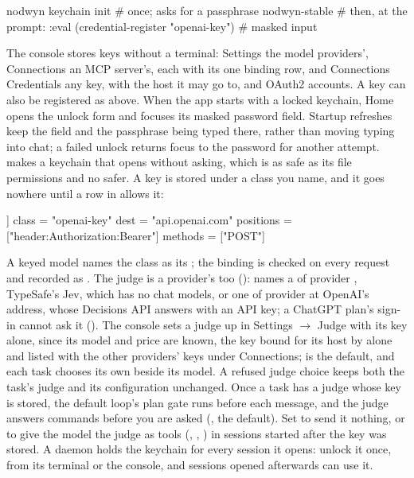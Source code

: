 \begin{sh}
nodwyn keychain init                       # once; asks for a passphrase
nodwyn-stable                              # then, at the prompt:
:eval (credential-register "openai-key")   # masked input
\end{sh}

The console stores keys without a terminal: Settings the model providers',
Connections an MCP server's, each with its one binding row, and Connections
\textrightarrow{} Credentials any key, with the host it may go to, and
OAuth2 accounts. A key can also be registered as above.
When the app starts with a locked keychain, Home opens the unlock form and
focuses its masked password field. Startup refreshes keep the field and the
passphrase being typed there, rather than moving typing into chat; a failed
unlock returns focus to the password for another attempt.
 makes a keychain that opens
without asking, which is as safe as its file permissions and no safer. A key is
stored under a class you name, and it goes nowhere until a row in
 allows it:

\begin{txt}
[[bind]]
class = "openai-key"
dest = "api.openai.com"
positions = ["header:Authorization:Bearer"]
methods = ["POST"]
\end{txt}

A keyed model names the class as its ; the binding is
checked on every request and recorded as . The judge
is a provider's too ():  names a
 of provider , TypeSafe's Jev, which has no
chat models, or one of provider  at OpenAI's address, whose
Decisions API answers with an API key; a ChatGPT plan's sign-in cannot ask
it (). The console sets a judge up in Settings \(\rightarrow\)
Judge with its key alone, since its model and price are known, the key bound
for its host by  alone and listed with the other providers' keys
under Connections; \code{[judge]} is the default, and each task chooses its
own beside its model. A refused judge choice keeps both the task's judge and
its configuration unchanged. Once a task has a judge whose key is stored, the
default loop's plan gate runs before each message, and the judge answers
commands before you are asked (, the
default). Set  to send it nothing, or  to
give the model the judge as tools (, ,
) in sessions started after the key was stored. A daemon holds the
keychain for every session it opens: unlock it once, from its terminal or
the console, and sessions opened afterwards can use it.

